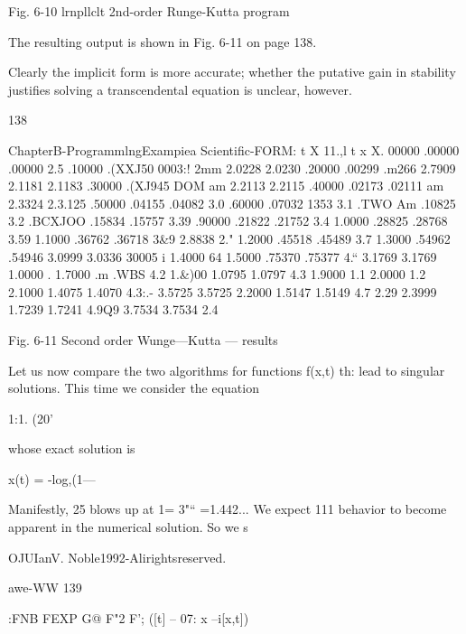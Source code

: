 {{ 

 

 

 

Fig. 6-10 lrnpllclt 2nd-order Runge-Kutta program

The resulting output is shown in Fig. 6-11 on page 138.

Clearly the implicit form is more accurate; whether the putative gain
in stability justiﬁes solving a transcendental equation is unclear,
however.

138

 

ChapterB-ProgrammlngExampiea Scientiﬁc-FORM:
t X 11.,l t x X.
00000 .00000 .00000 2.5%
.10000 .(XXJ50 0003:! 2mm 2.0228 2.0230
.20000 .00299 .m266 2.7909 2.1181 2.1183
.30000 .(XJ945 DOM am 2.2113 2.2115
.40000 .02173 .02111 am 2.3324 2.3.125
.50000 .04155 .04082 3.0%
.60000 .07032 1353 3.1%
.TWO Am .10825 3.2%
.BCXJOO .15834 .15757 3.39%
.90000 .21822 .21752 3.4%
1.0000 .28825 .28768 3.59%
1.1000 .36762 .36718 3&9 2.8838 2."
1.2000 .45518 .45489 3.7%
1.3000 .54962 .54946 3.0999 3.0336 30005 i
1.4000 64%
1.5000 .75370 .75377 4.“ 3.1769 3.1769
1.0000 .%
1.7000 .m .WBS 4.2%
1.&)00 1.0795 1.0797 4.3%
1.9000 1.1%
2.0000 1.2%
2.1000 1.4075 1.4070 4.3:.- 3.5725 3.5725
2.2000 1.5147 1.5149 4.7%
2.29%
2.3999 1.7239 1.7241 4.9Q9 3.7534 3.7534
2.4%

 

Fig. 6-11 Second order Wunge—Kutta — results

Let us now compare the two algorithms for functions f(x,t) th:
lead to singular solutions. This time we consider the equation

1:1. (20'

whose exact solution is

x(t) = -log,(1—%

Manifestly, 25 blows up at 1= 3"“ =1.442... We expect 111
behavior to become apparent in the numerical solution. So we s

 

OJUIanV. Noble1992-Alirightsreserved.

awe-WW 139

:FNB FEXP G@ F"2 F';
([t] -- 07: x --i[x,t])

}}
